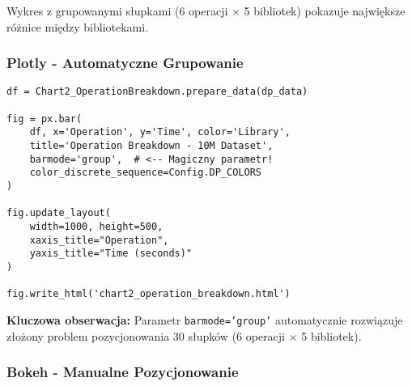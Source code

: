 \documentclass[a4paper,11pt]{article}
\begin{document}
Wykres z grupowanymi słupkami (6 operacji × 5 bibliotek) pokazuje
największe różnice między bibliotekami.

\subsubsection{Plotly - Automatyczne Grupowanie}

\begin{lstlisting}[caption={Chart 2: Grouped Bars - Plotly (10 LOC)},label={lst:chart2_plotly}]
df = Chart2_OperationBreakdown.prepare_data(dp_data)

fig = px.bar(
    df, x='Operation', y='Time', color='Library',
    title='Operation Breakdown - 10M Dataset',
    barmode='group',  # <-- Magiczny parametr!
    color_discrete_sequence=Config.DP_COLORS
)

fig.update_layout(
    width=1000, height=500,
    xaxis_title="Operation",
    yaxis_title="Time (seconds)"
)

fig.write_html('chart2_operation_breakdown.html')
\end{lstlisting}

\textbf{Kluczowa obserwacja:} Parametr \texttt{barmode='group'} automatycznie
rozwiązuje złożony problem pozycjonowania 30 słupków (6 operacji × 5 bibliotek).

\subsubsection{Bokeh - Manualne Pozycjonowanie}
\end{document}
